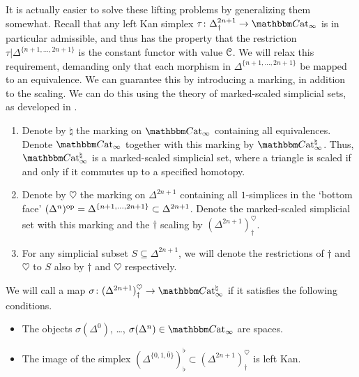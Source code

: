 \documentclass[main.tex]{subfiles}
\begin{document}
It is actually easier to solve these lifting problems by generalizing them somewhat. Recall that any left Kan simplex $\tau\colon \Delta^{2n+1}_{\dagger} \to \ICCat$ is in particular admissible, and thus has the property that the restriction $\tau|\Delta^{\{n+1, \ldots, 2n+1\}}$ is the constant functor with value $\mathcal{C}$. We will relax this requirement, demanding only that each morphism in $\Delta^{\{n+1, \ldots, 2n+1\}}$ be mapped to an equivalence. We can guarantee this by introducing a marking, in addition to the scaling. We can do this using the theory of marked-scaled simplicial sets, as developed in \cite{garcia20212}.

\begin{notation}
  \leavevmode
  \begin{enumerate}
    \item Denote by $\natural$ the marking on $\ICCat$ containing all equivalences. Denote $\ICCat$ together with this marking by $\ICCat^{\natural}$. Thus, $\ICCat^{\natural}$ is a marked-scaled simplicial set, where a triangle is scaled if and only if it commutes up to a specified homotopy.

    \item Denote by $\heartsuit$ the marking on $\Delta^{2n+1}$ containing all $1$-simplices in the `bottom face' $(\Delta^{n})^{\mathrm{op}} = \Delta^{\{n+1, \ldots, 2n+1\}} \subset \Delta^{2n+1}$. Denote the marked-scaled simplicial set with this marking and the $\dagger$ scaling by $(\Delta^{2n+1})^{\heartsuit}_{\dagger}$.

    \item For any simplicial subset $S \subseteq \Delta^{2n+1}$, we will denote the restrictions of $\dagger$ and $\heartsuit$ to $S$ also by $\dagger$ and $\heartsuit$ respectively.
  \end{enumerate}
\end{notation}

\begin{definition}
  \label{def:weakly_left_kan}
  We will call a map $\sigma\colon (\Delta^{2n+1})^{\heartsuit}_{\dagger} \to \ICCat^{\natural}$  if it satisfies the following conditions.
  \begin{itemize}
    \item The objects $\sigma(\Delta^{0})$, \dots, $\sigma(\Delta^{n}) \in \ICCat$ are spaces.

    \item The image of the simplex $(\Delta^{\{0, 1, \overline{0}\}})^{\flat}_{\flat} \subset (\Delta^{2n+1})^{\heartsuit}_{\dagger}$ is left Kan.
  \end{itemize}
\end{definition}
\end{document}
